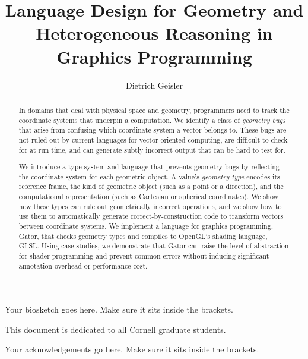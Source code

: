 \documentclass[phd,tocprelim]{cornell}
\title {Language Design for Geometry and Heterogeneous Reasoning in Graphics Programming}
\author {Dietrich Geisler}
\begin{document}
\maketitle
\makecopyright

\begin{abstract}
In domains that deal with physical space and geometry,
programmers need to track the coordinate systems that underpin a computation.
We identify a class of \emph{geometry bugs} that arise from confusing which coordinate system a vector belongs to.
These bugs are not ruled out by current languages for vector-oriented computing, are difficult to check for at run time, and can generate subtly incorrect output that can be hard to test for.

We introduce a type system and language that prevents geometry bugs by reflecting the coordinate system for each geometric object.
A value's \emph{geometry type} encodes its reference frame, the kind of geometric object (such as a point or a direction), and the computational representation (such as Cartesian or spherical coordinates).
We show how these types can rule out geometrically incorrect operations,
and we show how to use them to automatically generate correct-by-construction code to transform vectors between coordinate systems.
We implement a language for graphics programming, Gator, that checks geometry types and compiles to OpenGL's shading language, GLSL.
Using case studies, we demonstrate that Gator can raise the level of abstraction for shader programming and prevent common errors without inducing significant annotation overhead or performance cost.
\end{abstract}

\begin{biosketch}
Your biosketch goes here. Make sure it sits inside
the brackets.
\end{biosketch}

\begin{dedication}
This document is dedicated to all Cornell graduate students.
\end{dedication}

\begin{acknowledgements}
Your acknowledgements go here. Make sure it sits inside the brackets.
\end{acknowledgements}

\contentspage
\tablelistpage
\figurelistpage

\normalspacing \setcounter{page}{1} 
\pagestyle{cornell} \addtolength{\parskip}{0.5\baselineskip}
\end{document}
